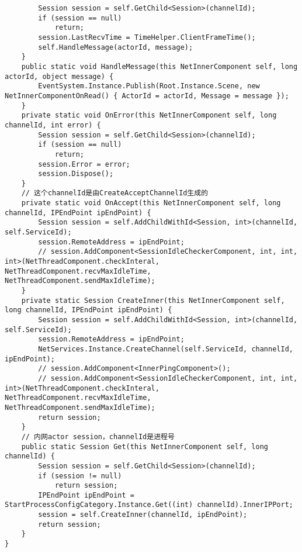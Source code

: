 \documentclass[9pt, b5paper]{article}
\begin{document}
\begin{verbatim}
        Session session = self.GetChild<Session>(channelId);
        if (session == null) 
            return;
        session.LastRecvTime = TimeHelper.ClientFrameTime();
        self.HandleMessage(actorId, message);
    }
    public static void HandleMessage(this NetInnerComponent self, long actorId, object message) {
        EventSystem.Instance.Publish(Root.Instance.Scene, new NetInnerComponentOnRead() { ActorId = actorId, Message = message });
    }
    private static void OnError(this NetInnerComponent self, long channelId, int error) {
        Session session = self.GetChild<Session>(channelId);
        if (session == null) 
            return;
        session.Error = error;
        session.Dispose();
    }
    // 这个channelId是由CreateAcceptChannelId生成的
    private static void OnAccept(this NetInnerComponent self, long channelId, IPEndPoint ipEndPoint) {
        Session session = self.AddChildWithId<Session, int>(channelId, self.ServiceId);
        session.RemoteAddress = ipEndPoint;
        // session.AddComponent<SessionIdleCheckerComponent, int, int, int>(NetThreadComponent.checkInteral, NetThreadComponent.recvMaxIdleTime, NetThreadComponent.sendMaxIdleTime);
    }
    private static Session CreateInner(this NetInnerComponent self, long channelId, IPEndPoint ipEndPoint) {
        Session session = self.AddChildWithId<Session, int>(channelId, self.ServiceId);
        session.RemoteAddress = ipEndPoint;
        NetServices.Instance.CreateChannel(self.ServiceId, channelId, ipEndPoint);
        // session.AddComponent<InnerPingComponent>();
        // session.AddComponent<SessionIdleCheckerComponent, int, int, int>(NetThreadComponent.checkInteral, NetThreadComponent.recvMaxIdleTime, NetThreadComponent.sendMaxIdleTime);
        return session;
    }
    // 内网actor session，channelId是进程号
    public static Session Get(this NetInnerComponent self, long channelId) {
        Session session = self.GetChild<Session>(channelId);
        if (session != null) 
            return session;
        IPEndPoint ipEndPoint = StartProcessConfigCategory.Instance.Get((int) channelId).InnerIPPort;
        session = self.CreateInner(channelId, ipEndPoint);
        return session;
    }
}
\end{verbatim}
\end{document}
